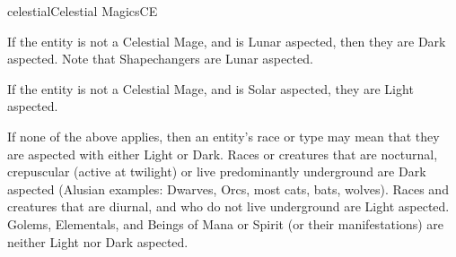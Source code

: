 \begin{College}[1.3]{celestial}{Celestial Magics}{CE}
\begin{Itemize}
\item If the entity is not a Celestial Mage, and is Lunar aspected,
  then they are Dark aspected.  Note that Shapechangers are Lunar
  aspected.

\item If the entity is not a Celestial Mage, and is Solar aspected,
  they are Light aspected.

\item If none of the above applies, then an entity’s race or type may
  mean that they are aspected with either Light or Dark.  Races or
  creatures that are nocturnal, crepuscular (active at twilight) or
  live predominantly underground are Dark aspected (Alusian examples:
  Dwarves, Orcs, most cats, bats, wolves).  Races and creatures that
  are diurnal, and who do not live underground are Light aspected.
  Golems, Elementals, and Beings of Mana or Spirit (or their
  manifestations) are neither Light nor Dark aspected.
\end{Itemize}

\begin{table*}

\end{table*}
\end{College}
